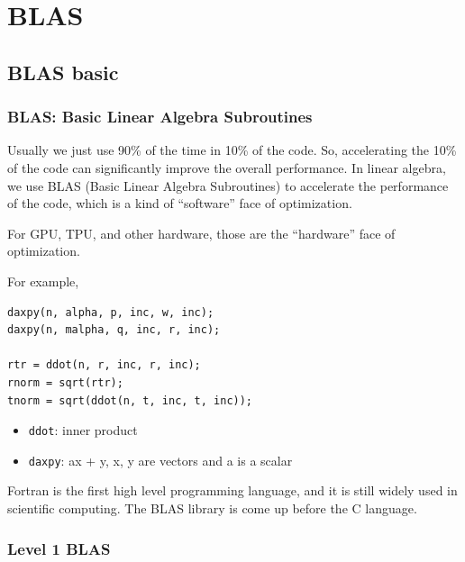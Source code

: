 \chapter{BLAS}


\section{BLAS basic}

\subsection{BLAS: Basic Linear Algebra Subroutines}

Usually we just use 90\% of the time in 10\% of the code. So, accelerating the 10\% of the code can significantly improve the overall performance. In linear algebra, we use BLAS (Basic Linear Algebra Subroutines) to accelerate the performance of the code, which is a kind of ``software'' face of optimization.

\begin{note}
    For GPU, TPU, and other hardware, those are the ``hardware'' face of optimization.
\end{note}

For example, 

\begin{verbatim}
daxpy(n, alpha, p, inc, w, inc);
daxpy(n, malpha, q, inc, r, inc);

rtr = ddot(n, r, inc, r, inc);
rnorm = sqrt(rtr);
tnorm = sqrt(ddot(n, t, inc, t, inc));
\end{verbatim}

\begin{itemize}
    \item \texttt{ddot}: inner product
    \item \texttt{daxpy}: ax + y, x, y are vectors and a is a scalar
\end{itemize}

\begin{note}
    Fortran is the first high level programming language, and it is still widely used in scientific computing. The BLAS library is come up before the C language.
\end{note}

\subsection{Level 1 BLAS}


